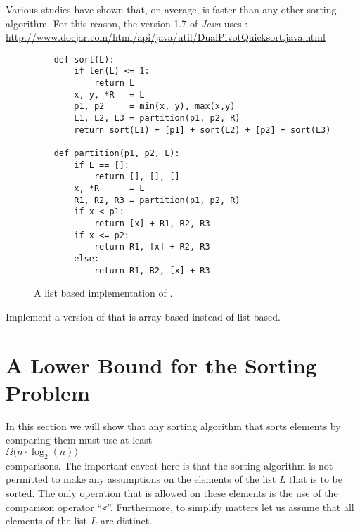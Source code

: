 \begin{enumerate}
      Various studies have shown that, on average,  is faster than any other sorting
      algorithm.  For this reason, the version 1.7 of \textsl{Java} uses :
      \\[0.2cm]
      \hspace*{0.3cm}
      \href{http://www.docjar.com/html/api/java/util/DualPivotQuicksort.java.html}{http://www.docjar.com/html/api/java/util/DualPivotQuicksort.java.html} 
\end{enumerate}

\begin{figure}[!ht]
\centering
\begin{verbatim}
    def sort(L):
        if len(L) <= 1:
            return L
        x, y, *R   = L
        p1, p2     = min(x, y), max(x,y)
        L1, L2, L3 = partition(p1, p2, R)
        return sort(L1) + [p1] + sort(L2) + [p2] + sort(L3)
    
    def partition(p1, p2, L):
        if L == []:
            return [], [], []
        x, *R      = L
        R1, R2, R3 = partition(p1, p2, R)
        if x < p1:
            return [x] + R1, R2, R3
        if x <= p2:
            return R1, [x] + R2, R3
        else:
            return R1, R2, [x] + R3
\end{verbatim}
\vspace*{-0.3cm}
\caption{A list based implementation of .}
\label{fig:dual-pivot-quick-sort.stlx}
\end{figure}

\exercise
Implement a version of  that is array-based instead of list-based.
\eoxs


\section{A Lower Bound for the Sorting Problem}
In this section we will show that any sorting algorithm that sorts elements by comparing them must
use at least 
\\[0.2cm]
\hspace*{1.3cm}
 $\Omega\bigl(n \cdot \log_2(n)\bigr)$ 
\\[0.2cm]
comparisons.  The important caveat here is that the sorting algorithm is not permitted to make any assumptions
on the elements of the list $L$ that is to be sorted.  The only operation that is allowed on these
elements is the use of the comparison operator ``\texttt{<}''.  Furthermore, to simplify matters let
us assume that all elements of the list $L$ are distinct.

